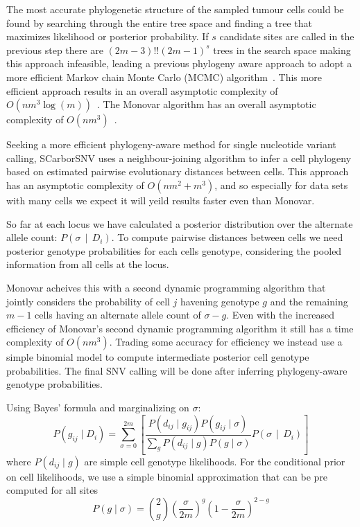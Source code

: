 \documentclass[../../main.tex]{subfiles}
\begin{document}
The most accurate phylogenetic structure of the sampled tumour cells could be found by searching through the entire tree space and finding a tree that maximizes likelihood or posterior probability.
If $s$ candidate sites are called in the previous step there are $(2m-3)!!(2m-1)^s$ trees in the search space making this approach infeasible, leading a previous phylogeny aware approach to adopt a more efficient Markov chain Monte Carlo (MCMC) algorithm~\cite{sciphi}.
This more efficient approach results in an overall asymptotic complexity of $O(nm^3\log(m))$~\cite{sciphi}.
The Monovar algorithm has an overall asymptotic complexity of $O(nm^3)$~\cite{monovar}.

Seeking a more efficient phylogeny-aware method for single nucleotide variant calling, SCarborSNV uses a neighbour-joining algorithm to infer a cell phylogeny based on estimated pairwise evolutionary distances between cells.
This approach has an asymptotic complexity of $O(nm^2+m^3)$, and so especially for data sets with many cells we expect it will yeild results faster even than Monovar.

So far at each locus we have calculated a posterior distribution over the alternate allele count: $P(\sigma\,\mid\,D_i)$.
To compute pairwise distances between cells we need posterior genotype probabilities for each cells genotype, considering the pooled information from all cells at the locus.

Monovar acheives this with a second dynamic programming algorithm that jointly considers the probability of cell $j$ havening genotype $g$ and the remaining $m-1$ cells having an alternate allele count of $\sigma - g$.
Even with the increased efficiency of Monovar's second dynamic programming algorithm it still has a time complexity of $O(nm^3)$.
Trading some accuracy for efficiency we instead use a simple binomial model to compute intermediate posterior cell genotype probabilities. 
The final SNV calling will be done after inferring phylogeny-aware genotype probabilities.

Using Bayes' formula and marginalizing on $\sigma$:
\begin{equation}\label{eq:posteriorgenotypes}
P(g_{ij}\mid D_i) = \sum_{\sigma=0}^{2m}  \left[ \frac{P(d_{ij}\mid g_{ij})P(g_{ij}\mid \sigma)}{\sum_g P(d_{ij}\mid g)P(g \mid \sigma)}  P(\sigma\,\mid\,D_i)\right]
\end{equation}
where $P(d_{ij}\mid g)$ are simple cell genotype likelihoods.
For the conditional prior on cell likelihoods, we use a simple binomial approximation that can be pre computed for all sites
\begin{equation*}
P(g\mid \sigma) = \binom{2}{g} \left(\frac{\sigma}{2m}\right)^g \left(1-\frac{\sigma}{2m}\right)^{2-g}
\end{equation*}
\end{document}

